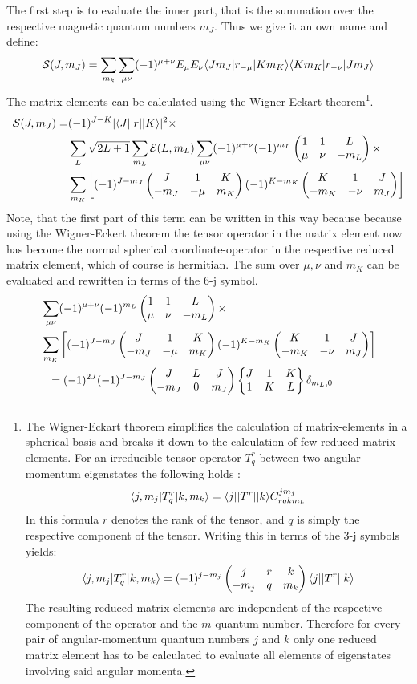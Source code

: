 The first step is to evaluate the inner part, that is the summation over the respective magnetic quantum numbers $m_J$. Thus we give it an own name and define:
\begin{equation}
\mathcal{S}(J,m_J)=\sum_{m_k}\sum_{\mu\nu}(-1)^{\mu+\nu}E_\mu E_\nu\langle Jm_J| r_{-\mu} | Km_K\rangle\langle Km_K| r_{-\nu} | Jm_J\rangle\label{sum}
\end{equation}
The matrix elements can be calculated using the Wigner-Eckart theorem\footnote{The Wigner-Eckart theorem simplifies the calculation of matrix-elements in a spherical basis and breaks it down to the calculation of few reduced matrix elements. For an irreducible tensor-operator $T^r_q$ between two angular-momentum eigenstates the following holds \cite[17]{wigner}:
\begin{equation}
\langle j,m_j| T^r_q | k,m_k\rangle=\langle j| |T^r| | k\rangle C^{jm_j}_{rqkm_k}
\end{equation}
In this formula $r$ denotes the rank of the tensor, and $q$ is simply the respective component of the tensor. Writing this in terms of the 3-j symbols yields:
\begin{equation}
\langle j,m_j| T^r_q | k,m_k\rangle=(-1)^{j-m_j}\begin{pmatrix}j&r&k\\-m_j&q&m_k\end{pmatrix}\langle j| |T^r| | k\rangle
\end{equation}
The resulting reduced matrix elements are independent of the respective component of the operator and the $m$-quantum-number. Therefore for every pair of angular-momentum quantum numbers $j$ and $k$ only one reduced matrix element has to be calculated to evaluate all elements of eigenstates involving said angular momenta.}.
\begin{align}
\mathcal{S}(J,m_J)=&(-1)^{J-K}|\langle J| |r| | K\rangle|^2\times\notag\\&\sum_L\sqrt{2L+1}\sum_{m_L}\mathcal{E}(L,m_L)\sum_{\mu\nu}(-1)^{\mu+\nu}(-1)^{m_L}\begin{pmatrix}1&1&L\\\mu&\nu&-m_L\end{pmatrix}\times\notag\\&\sum_{m_K}\left[(-1)^{J-m_J}\begin{pmatrix}J&1&K\\-m_J&-\mu&m_K\end{pmatrix}(-1)^{K-m_K}\begin{pmatrix}K&1&J\\-m_K&-\nu&m_J\end{pmatrix}\right]\label{sum2}
\end{align}
Note, that the first part of this term can be written in this way because because using the Wigner-Eckert theorem the tensor operator in the matrix element now has become the normal spherical coordinate-operator in the respective reduced matrix element, which of course is hermitian. The sum over $\mu,\nu$ and $m_K$ can be evaluated and rewritten in terms of the 6-j symbol.
\begin{align}
&\sum_{\mu\nu}(-1)^{\mu+\nu}(-1)^{m_L}\threej{1}{1}{L}{\mu}{\nu}{-m_L}\times\notag\\&\sum_{m_K}\left[(-1)^{J-m_J}\threej{J}{1}{K}{-m_J}{-\mu}{m_K}(-1)^{K-m_K}\threej{K}{1}{J}{-m_K}{-\nu}{m_J}\right]\notag\\&\ \ =(-1)^{2J}(-1)^{J-m_J}\threej{J}{L}{J}{-m_J}{0}{m_J}\sixj{J}{1}{K}{1}{K}{L}\delta_{m_L,0}
\end{align}
